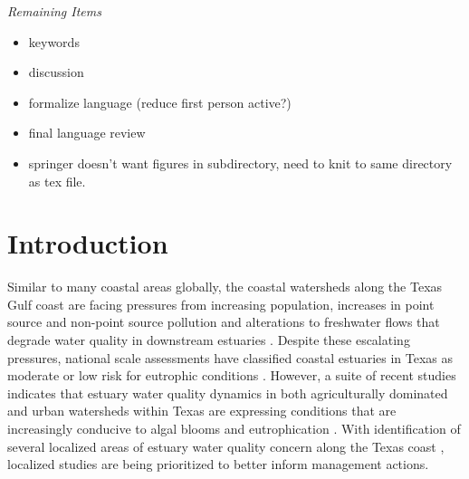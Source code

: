 \documentclass[sn-basic,referee,lineno,pdflatex]{sn-jnl}
\providecommand{\tightlist}{%
  \setlength{\itemsep}{0pt}\setlength{\parskip}{0pt}}
\begin{document}



\maketitle

\emph{Remaining Items}

\begin{itemize}
\tightlist
\item
  keywords
\item
  discussion
\item
  formalize language (reduce first person active?)
\item
  final language review
\item
  springer doesn't want figures in subdirectory, need to knit to same
  directory as tex file.
\end{itemize}

\hypertarget{sec1}{%
\section{Introduction}\label{sec1}}

Similar to many coastal areas globally, the coastal watersheds along the
Texas Gulf coast are facing pressures from increasing population,
increases in point source and non-point source pollution and alterations
to freshwater flows that degrade water quality in downstream estuaries
\citep{bricker_effects_2008, kennicuttWaterQualityGulf2017, bugica_water_2020}.
Despite these escalating pressures, national scale assessments have
classified coastal estuaries in Texas as moderate or low risk for
eutrophic conditions \citep{bricker_effects_2008}. However, a suite of
recent studies indicates that estuary water quality dynamics in both
agriculturally dominated and urban watersheds within Texas are
expressing conditions that are increasingly conducive to algal blooms
and eutrophication
\citep{wetzWaterQualityDynamics2016, wetz_exceptionally_2017, bugica_water_2020, chinPhytoplanktonBiomassCommunity2022}.
With identification of several localized areas of estuary water quality
concern along the Texas coast \citep{bugica_water_2020}, localized
studies are being prioritized to better inform management actions.
\end{document}
